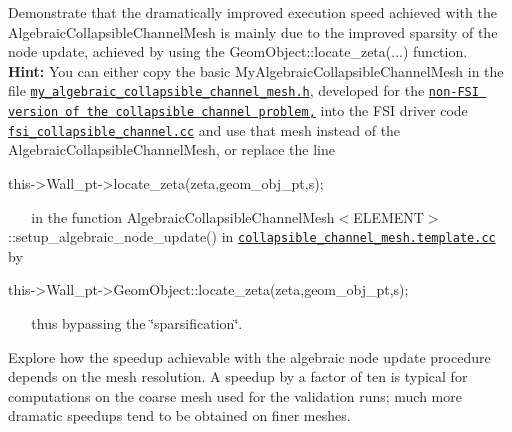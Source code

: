 \begin{DoxyEnumerate}
\item Demonstrate that the dramatically improved execution speed achieved with the {\ttfamily Algebraic\+Collapsible\+Channel\+Mesh} is mainly due to the improved sparsity of the node update, achieved by using the {\ttfamily Geom\+Object\+::locate\+\_\+zeta}(...) function. ~\newline
~\newline
 {\bfseries Hint\+:} You can either copy the basic {\ttfamily My\+Algebraic\+Collapsible\+Channel\+Mesh} in the file \href{../../../../demo_drivers/navier_stokes/collapsible_channel/my_alg_channel_mesh.h}{\tt my\+\_\+algebraic\+\_\+collapsible\+\_\+channel\+\_\+mesh.\+h}, developed for the \href{../../../navier_stokes/algebraic_collapsible_channel/html/index.html}{\tt non-\/\+F\+SI version of the collapsible channel problem,} into the F\+SI driver code \href{../../../../demo_drivers/interaction/fsi_collapsible_channel/fsi_collapsible_channel.cc}{\tt fsi\+\_\+collapsible\+\_\+channel.\+cc} and use that mesh instead of the {\ttfamily Algebraic\+Collapsible\+Channel\+Mesh}, or replace the line ~\newline
~\newline

\begin{DoxyCode}
this->Wall\_pt->locate\_zeta(zeta,geom\_obj\_pt,s);
\end{DoxyCode}
 ~\newline
~\newline
 in the function {\ttfamily Algebraic\+Collapsible\+Channel\+Mesh$<$\+E\+L\+E\+M\+E\+N\+T$>$\+::setup\+\_\+algebraic\+\_\+node\+\_\+update()} in \href{../../../../src/meshes/collapsible_channel_mesh.template.cc}{\tt collapsible\+\_\+channel\+\_\+mesh.\+template.\+cc} by ~\newline
~\newline

\begin{DoxyCode}
this->Wall\_pt->GeomObject::locate\_zeta(zeta,geom\_obj\_pt,s);
\end{DoxyCode}
 ~\newline
~\newline
 thus bypassing the \char`\"{}sparsification\char`\"{}. ~\newline
~\newline

\item Explore how the speedup achievable with the algebraic node update procedure depends on the mesh resolution. A speedup by a factor of ten is typical for computations on the coarse mesh used for the validation runs; much more dramatic speedups tend to be obtained on finer meshes. ~\newline
~\newline

\end{DoxyEnumerate}



